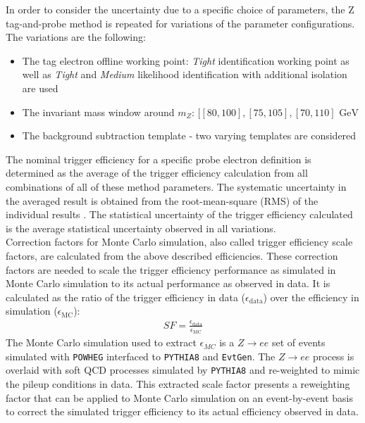 In order to consider the uncertainty due to a specific choice of parameters,  the Z tag-and-probe method is repeated for variations of the parameter configurations.  The variations are the following: 
\begin{itemize}
\item The tag electron offline working point:  \textit{Tight}  identification working point as well as \textit{Tight} and \textit{Medium} likelihood identification with additional isolation are used
\item The invariant mass window around $m_Z$: $[[80,100],[75,105],[70,110] \text{ GeV}$ 
\item The background subtraction template - two varying templates are considered
\end{itemize}
The nominal trigger efficiency for a specific probe electron definition is determined as the average of the trigger efficiency calculation from all combinations of all of these method parameters.  The systematic uncertainty in the averaged result is obtained from the root-mean-square (RMS) of the individual results \cite{ElectronRecoID1516}.
The statistical uncertainty of the trigger efficiency calculated is the average statistical uncertainty observed in all variations. \\
Correction factors for Monte Carlo simulation, also called trigger efficiency scale factors,  are calculated from the above described efficiencies. 
These correction factors are needed to scale the trigger efficiency performance as simulated in Monte Carlo simulation to its actual performance as observed in data. 
It is calculated as the ratio of the trigger efficiency in data ($\epsilon_{\text{data}}$) over the efficiency in simulation ($\epsilon_{\text{MC}}$):
\begin{align}
SF = \frac{\epsilon_{\text{data}}}{\epsilon_{\text{MC}}}
\end{align} 
The Monte Carlo simulation used to extract $\epsilon_{MC}$ is a $Z \rightarrow ee$ set of events simulated with \texttt{POWHEG} interfaced to \texttt{PYTHIA8} and \texttt{EvtGen}.
The $Z \rightarrow ee$ process is overlaid with soft QCD processes simulated by  \texttt{PYTHIA8} and re-weighted to mimic the pileup conditions in data.
This extracted scale factor presents a reweighting factor that can be applied to Monte Carlo simulation on an event-by-event basis to correct the simulated trigger efficiency to its actual efficiency observed in data.

